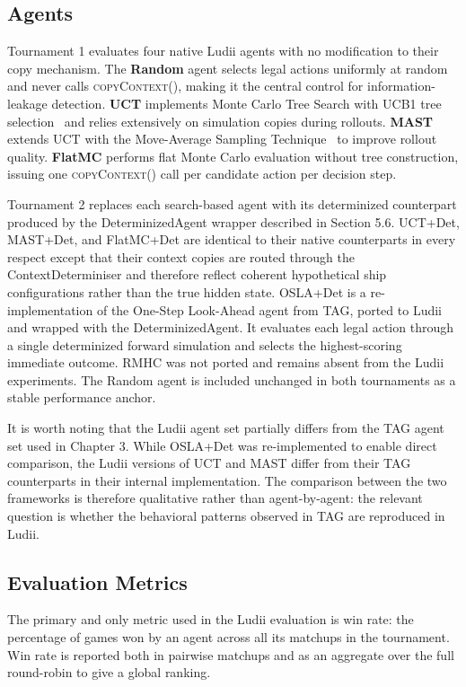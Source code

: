 \subsection{Agents}

Tournament 1 evaluates four native Ludii agents with no modification to their copy mechanism. The \textbf{Random} agent selects legal actions uniformly at random and never calls \textsc{copyContext()}, making it the central control for information-leakage detection. \textbf{UCT} implements Monte Carlo Tree Search with UCB1 tree selection~\cite{browne2012survey} and relies extensively on simulation copies during rollouts. \textbf{MAST} extends UCT with the Move-Average Sampling Technique~\cite{chaslot2008progressive} to improve rollout quality. \textbf{FlatMC} performs flat Monte Carlo evaluation without tree construction, issuing one \textsc{copyContext()} call per candidate action per decision step.

Tournament 2 replaces each search-based agent with its determinized 
counterpart produced by the DeterminizedAgent wrapper described in 
Section 5.6. UCT+Det, MAST+Det, and FlatMC+Det are identical to their 
native counterparts in every respect except that their context copies 
are routed through the ContextDeterminiser and therefore reflect 
coherent hypothetical ship configurations rather than the true hidden 
state. OSLA+Det is a re-implementation of the One-Step Look-Ahead agent 
from TAG, ported to Ludii and wrapped with the DeterminizedAgent. It 
evaluates each legal action through a single determinized forward 
simulation and selects the highest-scoring immediate outcome. RMHC was 
not ported and remains absent from the Ludii experiments. The Random 
agent is included unchanged in both tournaments as a stable performance 
anchor.

It is worth noting that the Ludii agent set partially differs from the 
TAG agent set used in Chapter 3. While OSLA+Det was re-implemented to 
enable direct comparison, the Ludii versions of UCT and MAST differ 
from their TAG counterparts in their internal implementation. The 
comparison between the two frameworks is therefore qualitative rather 
than agent-by-agent: the relevant question is whether the behavioral 
patterns observed in TAG are reproduced in Ludii.

\subsection{Evaluation Metrics}
The primary and only metric used in the Ludii evaluation is win 
rate: the percentage of games won by an agent across all its 
matchups in the tournament. Win rate is reported both in pairwise 
matchups and as an aggregate over the full round-robin to give a 
global ranking.

